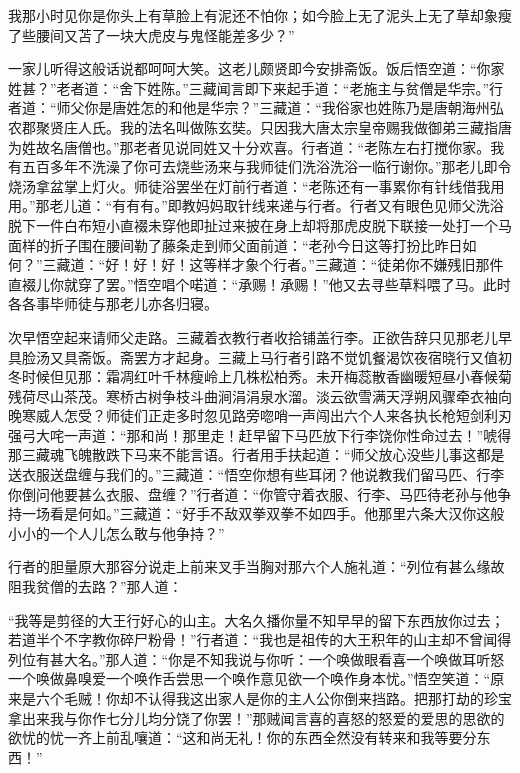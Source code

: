 \documentclass[12pt,UTF8]{ctexbook}
\begin{document}
{我那小时见你是你头上有草脸上有泥还不怕你；如今脸上无了泥头上无了草却象瘦了些腰间又苫了一块大虎皮与鬼怪能差多少？”

一家儿听得这般话说都呵呵大笑。这老儿颇贤即今安排斋饭。饭后悟空道：“你家姓甚？”老者道：“舍下姓陈。”三藏闻言即下来起手道：“老施主与贫僧是华宗。”行者道：“师父你是唐姓怎的和他是华宗？”三藏道：“我俗家也姓陈乃是唐朝海州弘农郡聚贤庄人氏。我的法名叫做陈玄奘。只因我大唐太宗皇帝赐我做御弟三藏指唐为姓故名唐僧也。”那老者见说同姓又十分欢喜。行者道：“老陈左右打搅你家。我有五百多年不洗澡了你可去烧些汤来与我师徒们洗浴洗浴一临行谢你。”那老儿即令烧汤拿盆掌上灯火。师徒浴罢坐在灯前行者道：“老陈还有一事累你有针线借我用用。”那老儿道：“有有有。”即教妈妈取针线来递与行者。行者又有眼色见师父洗浴脱下一件白布短小直裰未穿他即扯过来披在身上却将那虎皮脱下联接一处打一个马面样的折子围在腰间勒了藤条走到师父面前道：“老孙今日这等打扮比昨日如何？”三藏道：“好！好！好！这等样才象个行者。”三藏道：“徒弟你不嫌残旧那件直裰儿你就穿了罢。”悟空唱个喏道：“承赐！承赐！”他又去寻些草料喂了马。此时各各事毕师徒与那老儿亦各归寝。

次早悟空起来请师父走路。三藏着衣教行者收拾铺盖行李。正欲告辞只见那老儿早具脸汤又具斋饭。斋罢方才起身。三藏上马行者引路不觉饥餐渴饮夜宿晓行又值初冬时候但见那：霜凋红叶千林瘦岭上几株松柏秀。未开梅蕊散香幽暖短昼小春候菊残荷尽山茶茂。寒桥古树争枝斗曲涧涓涓泉水溜。淡云欲雪满天浮朔风骤牵衣袖向晚寒威人怎受？师徒们正走多时忽见路旁唿哨一声闯出六个人来各执长枪短剑利刃强弓大咤一声道：“那和尚！那里走！赶早留下马匹放下行李饶你性命过去！”唬得那三藏魂飞魄散跌下马来不能言语。行者用手扶起道：“师父放心没些儿事这都是送衣服送盘缠与我们的。”三藏道：“悟空你想有些耳闭？他说教我们留马匹、行李你倒问他要甚么衣服、盘缠？”行者道：“你管守着衣服、行李、马匹待老孙与他争持一场看是何如。”三藏道：“好手不敌双拳双拳不如四手。他那里六条大汉你这般小小的一个人儿怎么敢与他争持？”

行者的胆量原大那容分说走上前来叉手当胸对那六个人施礼道：“列位有甚么缘故阻我贫僧的去路？”那人道：

“我等是剪径的大王行好心的山主。大名久播你量不知早早的留下东西放你过去；若道半个不字教你碎尸粉骨！”行者道：“我也是祖传的大王积年的山主却不曾闻得列位有甚大名。”那人道：“你是不知我说与你听：一个唤做眼看喜一个唤做耳听怒一个唤做鼻嗅爱一个唤作舌尝思一个唤作意见欲一个唤作身本忧。”悟空笑道：“原来是六个毛贼！你却不认得我这出家人是你的主人公你倒来挡路。把那打劫的珍宝拿出来我与你作七分儿均分饶了你罢！”那贼闻言喜的喜怒的怒爱的爱思的思欲的欲忧的忧一齐上前乱嚷道：“这和尚无礼！你的东西全然没有转来和我等要分东西！”

}
\end{document}
